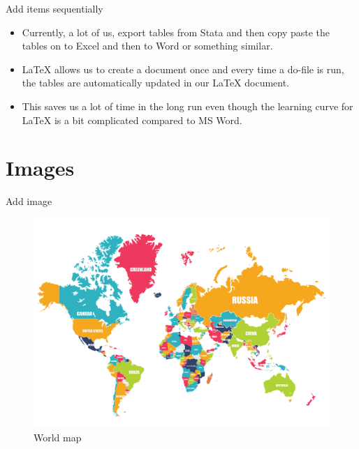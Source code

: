 \documentclass[aspectratio=169]{beamer} %
\begin{document}
\begin{frame}{Add items sequentially}

	\begin{itemize}
		\item<1->Currently, a lot of us, export tables from Stata and then copy paste the tables on to Excel and then to Word or something similar.
		\item<2->{\LaTeX} allows us to create a document once and every time a do-file is run, the tables are automatically updated in our {\LaTeX} document.
		\item<3->This saves us a lot of time in the long run even though the learning curve for {\LaTeX} is a bit complicated compared to MS Word.

	\end{itemize}
\end{frame}

\section{Images}
\begin{frame}{Add image}

	\begin{figure}
		\centering
		\includegraphics[height=.7\textheight]{img/world-map}
		\caption{World map}
		\label{fig:world-map}
	\end{figure}

\end{frame}
\end{document}
